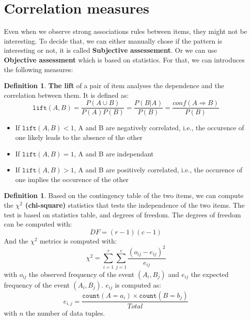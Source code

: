 \documentclass[12pt, openany]{report}
\theoremstyle{definition}
\newtheorem{definition}[thm]{Definition}
\begin{document}
\section{Correlation measures}
Even when we observe strong associations rules between items, they might not be interesting. To decide that, we can either manually chose if the pattern is interesting or not, it is called \textbf{Subjective assessement}. Or we can use \textbf{Objective assessment} which is based on statistics. For that, we can introduces the following measures:
\begin{definition}
    \textbf{The lift} of a pair of item analyses the dependence and the correlation between them. It is defined as:
    \begin{equation}
        \texttt{lift}(A,B) = \frac{P(A \cup B)}{P(A) P(B)} = \frac{P(B|A)}{P(B)} = \frac{conf(A \Rightarrow B)}{P(B)}
    \end{equation}
\end{definition}
\begin{itemize}
    \item If $\texttt{lift}(A,B) < 1$, A and B are negatively correlated, i.e., the occurence of one likely leads to the absence of the other
    \item If $\texttt{lift}(A,B) = 1$, A and B are independant
    \item If $\texttt{lift}(A,B) > 1$, A and B are positively correlated, i.e., the occurence of one implies the occurence of the other
\end{itemize}
\begin{definition}
    Based on the contingency table of the two items, we can compute the \textbf{$\chi^2$ (chi-square)} statistics that tests the independence of the two items. The test is based on statistics table, and degrees of freedom. The degrees of freedom can be computed with:
    \begin{equation}
        DF = (r-1)(c-1)
    \end{equation}
    And the $\chi^2$ metrics is computed with:
    \begin{equation}
        \chi^2 = \sum_{i=1}^{r} \sum_{j=1}^{c} \frac{(o_{ij} - e_{ij})^2}{e_{ij}}
    \end{equation}
    with $o_{ij}$ the observed frequency of the event $(A_i,B_j)$ and $e_{ij}$ the expected frequency of the event $(A_i,B_j)$. $e_{ij}$ is computed as:
    \begin{equation}
        e_{i,j} = \frac{\texttt{count}(A=a_i) \times \texttt{count}(B=b_j)}{Total}
    \end{equation}
    with $n$ the number of data tuples.
\end{definition}
\end{document}
